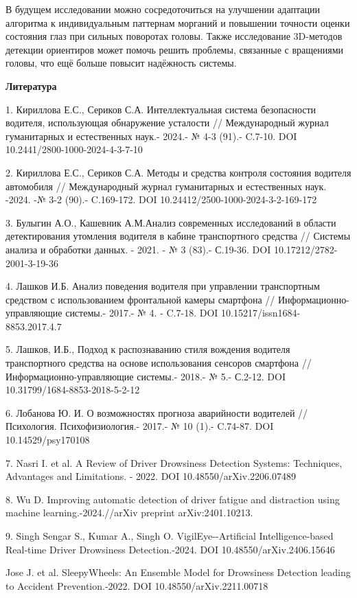 В будущем исследовании можно сосредоточиться на улучшении адаптации
алгоритма к индивидуальным паттернам морганий и повышении точности
оценки состояния глаз при сильных поворотах головы. Также исследование
3D-методов детекции ориентиров может помочь решить проблемы, связанные с
вращениями головы, что ещё больше повысит надёжность системы.

{\bfseries Литература}

1. Кириллова Е.С., Сериков С.А. Интеллектуальная система безопасности
водителя, использующая обнаружение усталости // Международный журнал
гуманитарных и естественных наук.- 2024.- № 4-3 (91).- C.7-10. DOI
10.2441/2800-1000-2024-4-3-7-10

2. Кириллова Е.С., Сериков С.А. Методы и средства контроля состояния
водителя автомобиля // Международный журнал гуманитарных и естественных
наук. -2024. -№ 3-2 (90).- C.169-172. DOI
10.24412/2500-1000-2024-3-2-169-172

3. Булыгин А.О., Кашевник А.М.Анализ современных исследований в области
детектирования утомления водителя в кабине транспортного средства //
Системы анализа и обработки данных. - 2021. - № 3 (83).- С.19-36. DOI
10.17212/2782-2001-3-19-36

4. Лашков И.Б. Анализ поведения водителя при управлении транспортным
средством с использованием фронтальной камеры смартфона //
Информационно-управляющие системы.- 2017.- № 4. - C.7-18. DOI
10.15217/issn1684-8853.2017.4.7

5. Лашков, И.Б., Подход к распознаванию стиля вождения водителя
транспортного средства на основе использования сенсоров смартфона //
Информационно-управляющие системы.- 2018.- № 5.- С.2-12. DOI
10.31799/1684-8853-2018-5-2-12

6. Лобанова Ю. И. О возможностях прогноза аварийности водителей //
Психология. Психофизиология.- 2017.- № 10 (1).- C.74-87. DOI
10.14529/psy170108

7. Nasri I. et al. A Review of Driver Drowsiness Detection Systems:
Techniques, Advantages and Limitations. - 2022. DOI
10.48550/arXiv.2206.07489

8. Wu D. Improving automatic detection of driver fatigue and distraction
using machine learning.-2024.//arXiv preprint arXiv:2401.10213.

9. Singh Sengar S., Kumar A., Singh O. VigilEye-\/-Artificial
Intelligence-based Real-time Driver Drowsiness Detection.-2024. DOI
10.48550/arXiv.2406.15646

Jose J. et al. SleepyWheels: An Ensemble Model for Drowsiness Detection
leading to Accident Prevention.-2022. DOI 10.48550/arXiv.2211.00718

